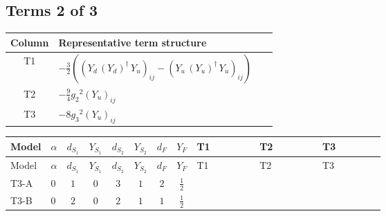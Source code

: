 \documentclass[8pt]{article}
\begin{document}
\begin{landscape}
\subsection*{Terms 2 of 3}
\begin{center}
\begin{tabular}{@{}c >{\raggedright\arraybackslash}p{0.82\linewidth}@{}}
\toprule
Column & Representative term structure \\
\midrule
T1 & \(\displaystyle -\frac{3}{2} (\left({Y_d}\,\left({Y_d}\right)^{\dagger}\,{Y_u}\right)_{ij}-\left({Y_u}\,\left({Y_u}\right)^{\dagger}\,{Y_u}\right)_{ij})\) \\
\midrule
T2 & \(\displaystyle -\frac{9}{4} {g_2}^2 \left({Y_u}\right)_{ij}\) \\
\midrule
T3 & \(\displaystyle -8 {g_3}^2 \left({Y_u}\right)_{ij}\) \\
\midrule
\bottomrule
\end{tabular}
\end{center}
\smallskip
\tiny
\begin{longtable}{@{}llcccccc >{\raggedright\arraybackslash}p{0.21\linewidth} >{\raggedright\arraybackslash}p{0.21\linewidth} >{\raggedright\arraybackslash}p{0.21\linewidth}@{}}
\toprule
Model & $\alpha$ & $d_{S_1}$ & $Y_{S_1}$ & $d_{S_2}$ & $Y_{S_2}$ & $d_F$ & $Y_F$ & T1 & T2 & T3 \\
\midrule
\endfirsthead
\toprule
Model & $\alpha$ & $d_{S_1}$ & $Y_{S_1}$ & $d_{S_2}$ & $Y_{S_2}$ & $d_F$ & $Y_F$ & T1 & T2 & T3 \\
\midrule
\endhead
T3-A & $0$ & $1$ & $0$ & $3$ & $1$ & $2$ & $\frac{1}{2}$ & \scriptsize\adjustbox{max width=\linewidth}{$\begin{gathered} -\frac{3}{2} (\left({Y_d}\,\left({Y_d}\right)^{\dagger}\,{Y_u}\right)_{ij}-\left({Y_u}\,\left({Y_u}\right)^{\dagger}\,{Y_u}\right)_{ij})\end{gathered}$} & \scriptsize\adjustbox{max width=\linewidth}{$\begin{gathered} -\frac{9}{4} {g_2}^2 \left({Y_u}\right)_{ij}\end{gathered}$} & \scriptsize\adjustbox{max width=\linewidth}{$\begin{gathered} -8 {g_3}^2 \left({Y_u}\right)_{ij}\end{gathered}$} \\
\midrule
T3-B & $0$ & $2$ & $0$ & $2$ & $1$ & $1$ & $\frac{1}{2}$ & \scriptsize\adjustbox{max width=\linewidth}{$\begin{gathered} -\frac{3}{2} (\left({Y_d}\,\left({Y_d}\right)^{\dagger}\,{Y_u}\right)_{ij}-\left({Y_u}\,\left({Y_u}\right)^{\dagger}\,{Y_u}\right)_{ij})\end{gathered}$} & \scriptsize\adjustbox{max width=\linewidth}{$\begin{gathered} -\frac{9}{4} {g_2}^2 \left({Y_u}\right)_{ij}\end{gathered}$} & \scriptsize\adjustbox{max width=\linewidth}{$\begin{gathered} -8 {g_3}^2 \left({Y_u}\right)_{ij}\end{gathered}$} \\

\end{longtable}
\end{landscape}
\end{document}
